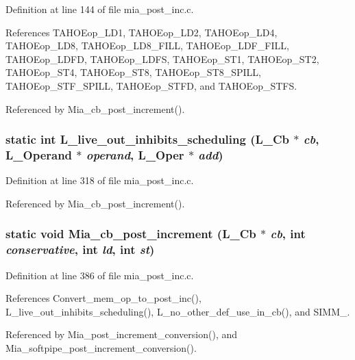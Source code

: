 Definition at line 144 of file mia\_\-post\_\-inc.c.

References TAHOEop\_\-LD1, TAHOEop\_\-LD2, TAHOEop\_\-LD4, TAHOEop\_\-LD8, TAHOEop\_\-LD8\_\-FILL, TAHOEop\_\-LDF\_\-FILL, TAHOEop\_\-LDFD, TAHOEop\_\-LDFS, TAHOEop\_\-ST1, TAHOEop\_\-ST2, TAHOEop\_\-ST4, TAHOEop\_\-ST8, TAHOEop\_\-ST8\_\-SPILL, TAHOEop\_\-STF\_\-SPILL, TAHOEop\_\-STFD, and TAHOEop\_\-STFS.

Referenced by Mia\_\-cb\_\-post\_\-increment().
\subsubsection{\setlength{\rightskip}{0pt plus 5cm}static int L\_\-live\_\-out\_\-inhibits\_\-scheduling (L\_\-Cb $\ast$ {\em cb}, L\_\-Operand $\ast$ {\em operand}, L\_\-Oper $\ast$ {\em add})\hspace{0.3cm}{\tt  [static]}}\label{mia__post__inc_8c_e0cf80e1d56b9e03208df238e7fe66ac}




Definition at line 318 of file mia\_\-post\_\-inc.c.

Referenced by Mia\_\-cb\_\-post\_\-increment().
\subsubsection{\setlength{\rightskip}{0pt plus 5cm}static void Mia\_\-cb\_\-post\_\-increment (L\_\-Cb $\ast$ {\em cb}, int {\em conservative}, int {\em ld}, int {\em st})\hspace{0.3cm}{\tt  [static]}}\label{mia__post__inc_8c_819c0b592ff0708b08f669148b1d7994}




Definition at line 386 of file mia\_\-post\_\-inc.c.

References Convert\_\-mem\_\-op\_\-to\_\-post\_\-inc(), L\_\-live\_\-out\_\-inhibits\_\-scheduling(), L\_\-no\_\-other\_\-def\_\-use\_\-in\_\-cb(), and SIMM\_.

Referenced by Mia\_\-post\_\-increment\_\-conversion(), and Mia\_\-softpipe\_\-post\_\-increment\_\-conversion().
